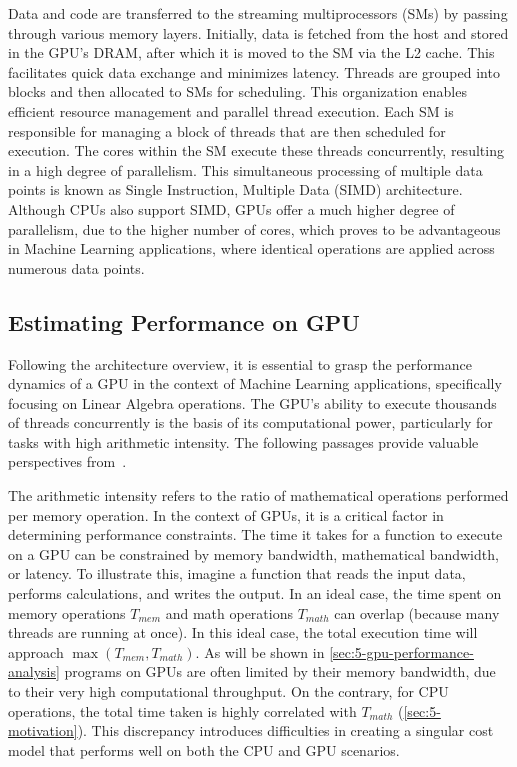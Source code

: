 Data and code are transferred to the streaming multiprocessors (SMs) by passing through various memory layers. Initially, data is fetched from the host and stored in the GPU's DRAM, after which it is moved to the SM via the L2 cache. This facilitates quick data exchange and minimizes latency. Threads are grouped into blocks and then allocated to SMs for scheduling. This organization enables efficient resource management and parallel thread execution. Each SM is responsible for managing a block of threads that are then scheduled for execution. The cores within the SM execute these threads concurrently, resulting in a high degree of parallelism. This simultaneous processing of multiple data points is known as Single Instruction, Multiple Data (SIMD) architecture. Although CPUs also support SIMD, GPUs offer a much higher degree of parallelism, due to the higher number of cores, which proves to be advantageous in Machine Learning applications, where identical operations are applied across numerous data points.

\subsection{Estimating Performance on GPU}
\label{subsec:gpu-performance}
Following the architecture overview, it is essential to grasp the performance dynamics of a GPU in the context of Machine Learning applications, specifically focusing on Linear Algebra operations. The GPU's ability to execute thousands of threads concurrently is the basis of its computational power, particularly for tasks with high arithmetic intensity. The following passages provide valuable perspectives from~\cite{nvidia-gpu-performance:online}.

The arithmetic intensity refers to the ratio of mathematical operations performed per memory operation. In the context of GPUs, it is a critical factor in determining performance constraints. The time it takes for a function to execute on a GPU can be constrained by memory bandwidth, mathematical bandwidth, or latency. To illustrate this, imagine a function that reads the input data, performs calculations, and writes the output. In an ideal case, the time spent on memory operations $ T_{mem} $ and math operations $ T_{math} $ can overlap (because many threads are running at once). In this ideal case, the total execution time will approach $ \max(T_{mem}, T_{math})$. As will be shown in \autoref{sec:5-gpu-performance-analysis} programs on GPUs are often limited by their memory bandwidth, due to their very high computational throughput. On the contrary, for CPU operations, the total time taken is highly correlated with $T_{math}$ (\autoref{sec:5-motivation}). This discrepancy introduces difficulties in creating a singular cost model that performs well on both the CPU and GPU scenarios.

